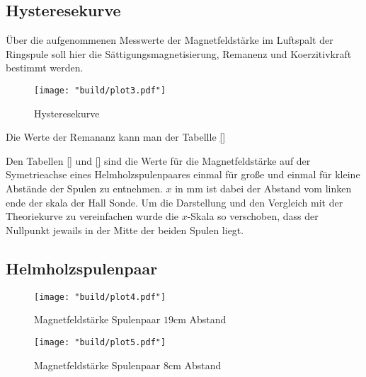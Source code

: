 \subsection{Hysteresekurve}
Über die aufgenommenen Messwerte der Magnetfeldstärke im Luftspalt der Ringspule
soll hier die Sättigungsmagnetisierung, Remanenz und Koerzitivkraft bestimmt
werden.
\begin{figure}[H]
    \caption{Hysteresekurve}
    \label{fig:3}
    \centering
    \texttt{[image: "build/plot3.pdf"]}
\end{figure}
Die Werte der Remananz kann man der Tabellle \autoref{}





Den Tabellen \autoref{} und \autoref{} sind die Werte für die Magnetfeldstärke auf der 
Symetrieachse eines Helmholzspulenpaares einmal für große und einmal für kleine 
Abstände der Spulen zu entnehmen. $x$ in $\unit{\milli\meter} $ ist dabei der Abstand 
vom linken ende der skala der Hall Sonde. Um die Darstellung und den Vergleich mit der 
Theoriekurve zu vereinfachen wurde die $x$-Skala so verschoben, dass der Nullpunkt jewails 
in der Mitte der beiden Spulen liegt.
\subsection{Helmholzspulenpaar}
\begin{figure}
    \caption{Magnetfeldstärke Spulenpaar $19\unit{\centi\meter}$ Abstand}
    \label{fig:4}
    \centering
    \texttt{[image: "build/plot4.pdf"]}
\end{figure}

\begin{figure}
    \caption{Magnetfeldstärke Spulenpaar $8\unit{\centi\meter}$ Abstand}
    \label{fig:5}
    \centering
    \texttt{[image: "build/plot5.pdf"]}
\end{figure}